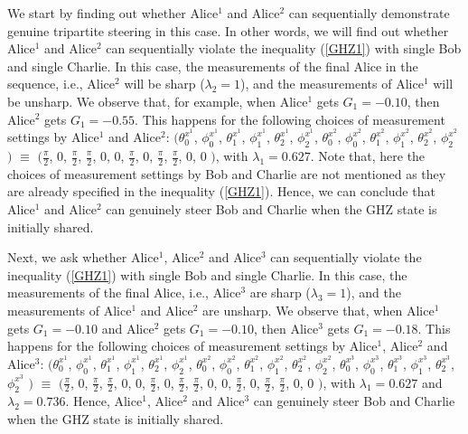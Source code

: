 \documentclass[pra,a4paper,aps,twocolumn,showpacs,superscriptaddress,groupedaddress]{revtex4}
\begin{document}
 We start by finding out  whether Alice$^1$ and Alice$^2$ can sequentially demonstrate genuine tripartite steering in this case. In other words, we will find out whether Alice$^1$ and Alice$^2$ can sequentially violate the inequality (\ref{GHZ1}) with single Bob and single Charlie. In this case, the measurements of the final Alice in the sequence,  i.e., Alice$^2$ will be sharp ($\lambda_2 = 1$), and the measurements of Alice$^1$ will be unsharp. We observe that, for example, when  Alice$^1$ gets $G_1 = -0.10$, then Alice$^2$ gets $G_1 = -0.55$. This happens for the following choices of measurement settings by Alice$^1$ and Alice$^2$:  $( \theta^{x^1}_0$, $\phi^{x^1}_0$, $\theta^{x^1}_1$, $\phi^{x^1}_1$, $\theta^{x^1}_2$, $\phi^{x^1}_2$,  $\theta^{x^2}_0$, $\phi^{x^2}_0$, $\theta^{x^2}_1$, $\phi^{x^2}_1$, $\theta^{x^2}_2$, $\phi^{x^2}_2$ $)$ $\equiv$ $( \frac{\pi}{2}$, $0$, $\frac{\pi}{2}$, $\frac{\pi}{2}$, $0$, $0$,  $\frac{\pi}{2}$, $0$, $\frac{\pi}{2}$, $\frac{\pi}{2}$, $0
 $, $0$ $)$, with $\lambda_1 = 0.627$. Note that, here the choices of measurement settings by Bob and Charlie are not mentioned as they are already specified in the inequality (\ref{GHZ1}). Hence, we can conclude that Alice$^1$ and Alice$^2$ can genuinely steer Bob and Charlie when the GHZ state is initially shared.

Next, we ask whether Alice$^1$, Alice$^2$ and Alice$^3$ can sequentially violate the inequality (\ref{GHZ1}) with single Bob and single Charlie. In this case, the measurements of the final Alice, i.e., Alice$^3$ are sharp ($\lambda_3 = 1$), and the measurements of Alice$^1$ and Alice$^2$ are unsharp. We observe that, when Alice$^1$ gets $G_1 = -0.10$ and Alice$^2$ gets $G_1 = -0.10$, then Alice$^3$ gets $G_1 = -0.18$.  This happens for the following choices of measurement settings by Alice$^1$, Alice$^2$ and Alice$^3$:  $( \theta^{x^1}_0$, $\phi^{x^1}_0$, $\theta^{x^1}_1$, $\phi^{x^1}_1$, $\theta^{x^1}_2$, $\phi^{x^1}_2$,  $\theta^{x^2}_0$, $\phi^{x^2}_0$, $\theta^{x^2}_1$, $\phi^{x^2}_1$, $\theta^{x^2}_2$, $\phi^{x^2}_2$, $\theta^{x^3}_0$, $\phi^{x^3}_0$, $\theta^{x^3}_1$, $\phi^{x^3}_1$, $\theta^{x^3}_2$, $\phi^{x^3}_2$ $)$ $\equiv$ $( \frac{\pi}{2}$, $0$, $\frac{\pi}{2}$, $\frac{\pi}{2}$, $0$, $0$,  $\frac{\pi}{2}$, $0$, $\frac{\pi}{2}$, $\frac{\pi}{2}$, $0$, $0$,  $\frac{\pi}{2}$, $0$, $\frac{\pi}{2}$, $\frac{\pi}{2}$, $0$, $0$ $)$, with $\lambda_1 = 0.627$ and $\lambda_2 = 0.736$. Hence, Alice$^1$, Alice$^2$ and Alice$^3$ can genuinely steer Bob and Charlie when the GHZ state is initially shared.
\end{document}
